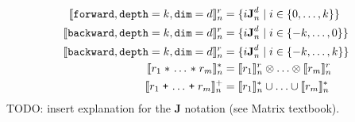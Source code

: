 \newcommand{\singleEntry}[2]{\textbf{J}_{#2}^{#1}}
\begin{align*}
%
%
\interp{\stenFwd{k}{d}}^r_n & =
 \{i\singleEntry{d}{n} \mid i \in \{0, \ldots, k\} \} \\
\interp{\stenBwd{k}{d}}^r_n & =
 \{i\singleEntry{d}{n} \mid i \in \{-k, \ldots, 0\} \} \\
\interp{\stenCen{k}{d}}^r_n & =
 \{i\singleEntry{d}{n} \mid i \in \{-k, \ldots, k\} \} \\
%
%
\interp{r_1 \; \texttt{$\ast$} \, \ldots \, \texttt{$\ast$} \; r_m}^{\ast}_n &
= \interp{r_1}^r_n \otimes \ldots \otimes \interp{r_m}^r_n \\
%
%
\interp{r_1 \; \texttt{+} \, \ldots \, \texttt{+} \; r_m}^{+}_n &
= \interp{r_1}^{\ast}_n \cup \ldots \cup \interp{r_m}^{\ast}_n \\
\end{align*}
TODO: insert explanation for the $\textbf{J}$ notation (see Matrix textbook).